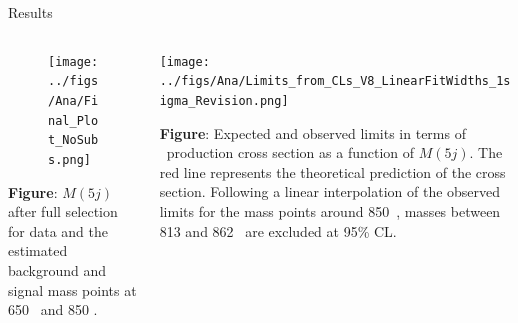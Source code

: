 \begin{frame}{Results}
\vspace{-.2cm}

\begin{columns}
\begin{column}{.50\textwidth}\tiny
\begin{figure}[!Hhtbp]
  \begin{center}
    \texttt{[image: ../figs/Ana/Final\_Plot\_NoSubs.png]}
  \end{center}
\end{figure}

\textbf{Figure}: $M(5j)$ after full selection for data and the estimated background and signal mass points at 650 \GeVcc~and 850 \GeVcc.
\end{column}

\begin{column}{.50\textwidth}\tiny
  \begin{center}
    \texttt{[image: ../figs/Ana/Limits\_from\_CLs\_V8\_LinearFitWidths\_1sigma\_Revision.png]}
  \end{center}
\textbf{Figure}: Expected and observed limits in terms of \Tp~production cross section as a function of $M(5j)$. The red line represents the theoretical prediction of the cross section. Following a linear interpolation of the observed limits for the mass points around 850~\GeVcc, masses between 813 and 862 \GeVcc~are excluded at 95\% CL.
\end{column}

\end{columns}

\end{frame}
\fi